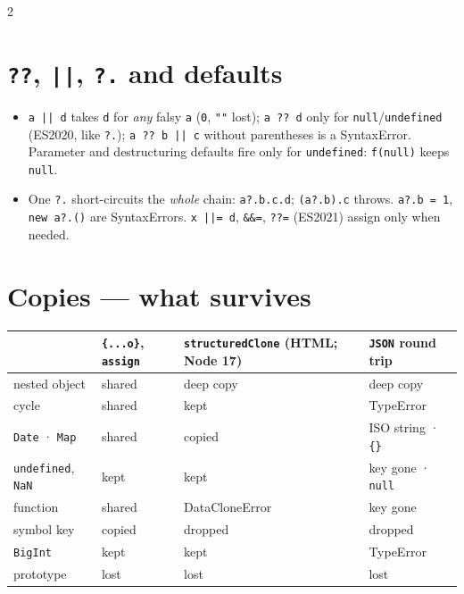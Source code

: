 \documentclass[8pt]{extarticle}
\newcommand\qq{\hbox{?}\hbox{?}}
\newcommand\qqe{\hbox{?}\hbox{?}\hbox{=}}
\newcommand\oo{\hbox{|}\hbox{|}}
\newcommand\ooe{\hbox{|}\hbox{|}\hbox{=}}
\newcommand\ane{\hbox{\&}\hbox{\&}\hbox{=}}
\newcommand\qd{\hbox{?}\hbox{.}}
\newcommand\spr{\hbox{.}\hbox{.}\hbox{.}}
\newcommand\ct[1]{\texttt{#1}}
\newcommand\bad[1]{\textcolor{sheetRed}{#1}}
\begin{document}
\begin{multicols}{2}
\section{\ct{\qq}, \ct{\oo}, \ct{\qd} and defaults}
\begin{itemize}
  \item \ct{a \oo{} d} takes \ct{d} for \emph{any} falsy \ct{a} (\ct{0}, \ct{""} lost);
        \ct{a \qq{} d} only for \ct{null}/\ct{undefined} (ES2020, like \ct{\qd}); \ct{a \qq{} b \oo{} c}
        without parentheses is a SyntaxError. Parameter and destructuring defaults fire only
        for \ct{undefined}: \ct{f(null)} keeps \ct{null}.
  \item One \ct{\qd} short-circuits the \emph{whole} chain: \ct{a\qd b.c.d}; \ct{(a\qd b).c}
        throws. \ct{a\qd b = 1}, \ct{new a\qd()} are SyntaxErrors.
        \ct{x \ooe{} d}, \ct{\ane}, \ct{\qqe} (ES2021) assign only when needed.
\end{itemize}

\section{Copies — what survives}
{\scriptsize\setlength{\tabcolsep}{2pt}\renewcommand{\arraystretch}{0.98}
\begin{tabular}{@{}>{\raggedright\arraybackslash}p{16mm}>{\raggedright\arraybackslash}p{17mm}>{\raggedright\arraybackslash}p{21mm}>{\raggedright\arraybackslash}p{19mm}@{}}
\toprule
 & \ct{\{\spr o\}}, \ct{assign} & \ct{structuredClone} (HTML; Node 17) & \ct{JSON} round trip\\
\midrule
nested object & \bad{shared} & deep copy & deep copy\\
cycle & \bad{shared} & kept & \bad{TypeError}\\
\ct{Date} · \ct{Map} & \bad{shared} & copied & \bad{ISO string · \ct{\{\}}}\\
\ct{undefined}, \ct{NaN} & kept & kept & \bad{key gone · \ct{null}}\\
function & shared & \bad{DataCloneError} & \bad{key gone}\\
symbol key & copied & \bad{dropped} & \bad{dropped}\\
\ct{BigInt} & kept & kept & \bad{TypeError}\\
prototype & \bad{lost} & \bad{lost} & \bad{lost}\\
\bottomrule
\end{tabular}}


\end{multicols}
\end{document}
